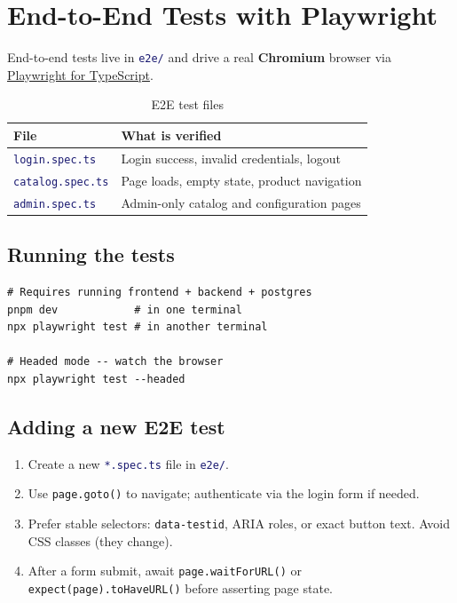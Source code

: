 \documentclass[12pt,a4paper,twoside]{report}
\newcommand{\code}[1]{\texttt{#1}}
\newcommand{\file}[1]{\texttt{\textcolor{MidnightBlue}{#1}}}
\begin{document}
\section{End-to-End Tests with Playwright}
\label{sec:e2e-tests}

End-to-end tests live in \file{e2e/} and drive a real
\textbf{Chromium} browser via
\href{https://playwright.dev}{Playwright for TypeScript}.

\begin{table}[H]
  \centering
  \caption{E2E test files}
  \begin{tabular}{@{}ll@{}}
    \toprule
    \textbf{File} & \textbf{What is verified} \\
    \midrule
    \file{login.spec.ts}   & Login success, invalid credentials, logout \\
    \file{catalog.spec.ts} & Page loads, empty state, product navigation \\
    \file{admin.spec.ts}   & Admin-only catalog and configuration pages \\
    \bottomrule
  \end{tabular}
\end{table}

\subsection*{Running the tests}

\begin{lstlisting}[style=bash]
# Requires running frontend + backend + postgres
pnpm dev            # in one terminal
npx playwright test # in another terminal

# Headed mode -- watch the browser
npx playwright test --headed
\end{lstlisting}

\subsection*{Adding a new E2E test}

\begin{enumerate}
  \item Create a new \file{*.spec.ts} file in \file{e2e/}.
  \item Use \code{page.goto()} to navigate; authenticate via the login
        form if needed.
  \item Prefer stable selectors: \code{data-testid}, ARIA roles, or
        exact button text. Avoid CSS classes (they change).
  \item After a form submit, await \code{page.waitForURL()} or
        \code{expect(page).toHaveURL()} before asserting page state.
\end{enumerate}
\end{document}
